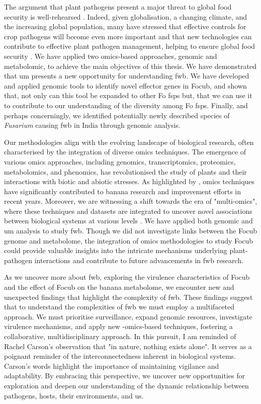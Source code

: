 The argument that plant pathogens present a major threat to global food security is well-rehearsed \parencite{Bebber2014, Fones2020, Nelson2020, Ristaino2021}. Indeed, given globalisation, a changing climate, and the increasing global population, many have stressed that effective controls for crop pathogens will become even more important and that new technologies can contribute to effective plant pathogen management, helping to ensure global food security \parencite{Jeger2021, Rizzo2021, Bebber2023, Singh2023}. We have applied two omics-based approaches, genomic and metabolomic, to achieve the main objectives of this thesis. We have demonstrated that \acl{um} presents a new opportunity for understanding \ac{fwb}. We have developed and applied genomic tools to identify novel effector genes in \ac{Focub}, and shown that, not only can this tool be expanded to other \ac{Fo} \acp{fsp} but, that we can use it to contribute to our understanding of the diversity among \ac{Fo} \acp{fsp}. Finally, and perhaps concerningly, we identified potentially newly described species of \textit{Fusarium} causing \ac{fwb} in India through genomic analysis. 

Our methodologies align with the evolving landscape of biological research, often characterised by the integration of diverse omics techniques. The emergence of various omics approaches, including genomics, transcriptomics, proteomics, metabolomics, and phenomics, has revolutionised the study of plants and their interactions with biotic and abiotic stresses. As highlighted by \textcite{Backiyarani2022}, omics techniques have significantly contributed to banana research and improvement efforts in recent years. Moreover, we are witnessing a shift towards the era of "multi-omics", where these techniques and datasets are integrated to uncover novel associations between biological systems at various levels \parencite{Hasin2017}. We have applied both genomic and \acl{um} analysis to study \ac{fwb}. Though we did not investigate links between the \ac{Focub} genome and metabolome, the integration of omics methodologies to study \ac{Focub} could provide valuable insights into the intricate mechanisms underlying plant-pathogen interactions and contribute to future advancements in \ac{fwb} research. 

As we uncover more about \ac{fwb}, exploring the virulence characteristics of \ac{Focub} and the effect of \ac{Focub} on the banana metabolome, we encounter new and unexpected findings that highlight the complexity of \ac{fwb}. These findings suggest that to understand the complexities of \ac{fwb} we must employ a multifaceted approach. We must prioritise surveillance, expand genomic resources, investigate virulence mechanisms, and apply new -omics-based techniques, fostering a collaborative, multidisciplinary approach. In this pursuit, I am reminded of Rachel Carson's observation that "in nature, nothing exists alone". It serves as a poignant reminder of the interconnectedness inherent in biological systems. Carson's words highlight the importance of maintaining vigilance and adaptability. By embracing this perspective, we uncover new opportunities for exploration and deepen our understanding of the dynamic relationship between pathogens, hosts, their environments, and us.


